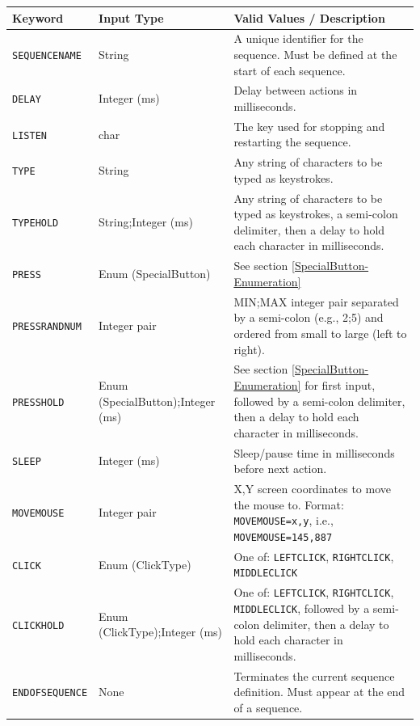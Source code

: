 \begin{table}[h]
	\centering
	\label{tab:sequencer_keywords}
	\begin{tabularx}{\textwidth}{|l|l|X|}
		\hline
		\textbf{Keyword} & \textbf{Input Type} & \textbf{Valid Values / Description} \\
		\hline
		\texttt{SEQUENCENAME} & String & A unique identifier for the sequence. Must be defined at the start of each sequence. \\
		\hline
		\texttt{DELAY} & Integer (ms) & Delay between actions in milliseconds.  \\
		\hline
		\texttt{LISTEN} & char & The key used for stopping and restarting the sequence.  \\
		\hline
		\texttt{TYPE} & String & Any string of characters to be typed as keystrokes. \\
		\hline
		\texttt{TYPEHOLD} & String;Integer (ms) & Any string of characters to be typed as keystrokes, a semi-colon delimiter, then a delay to hold each character in milliseconds. \\
		\hline
		\texttt{PRESS} & Enum (SpecialButton) & See section \ref{SpecialButton-Enumeration}\\
		\hline
		\texttt{PRESSRANDNUM} & Integer pair & MIN;MAX integer pair separated by a semi-colon (e.g., 2;5) and ordered from small to large (left to right). \\
		\hline
		\texttt{PRESSHOLD} & Enum (SpecialButton);Integer (ms) & See section \ref{SpecialButton-Enumeration} for first input, followed by a semi-colon delimiter, then a delay to hold each character in milliseconds.\\
		\hline
		\texttt{SLEEP} & Integer (ms) & Sleep/pause time in milliseconds before next action. \\
		\hline
		\texttt{MOVEMOUSE} & Integer pair & X,Y screen coordinates to move the mouse to. Format: \texttt{MOVEMOUSE=x,y}, i.e., \texttt{MOVEMOUSE=145,887} \\
		\hline
		\texttt{CLICK} & Enum (ClickType) & One of: \texttt{LEFTCLICK}, \texttt{RIGHTCLICK}, \texttt{MIDDLECLICK} \\
		\hline
		\texttt{CLICKHOLD} & Enum (ClickType);Integer (ms) & One of: \texttt{LEFTCLICK}, \texttt{RIGHTCLICK}, \texttt{MIDDLECLICK}, followed by a semi-colon delimiter, then a delay to hold each character in milliseconds. \\
		\hline
		\texttt{ENDOFSEQUENCE} & None & Terminates the current sequence definition. Must appear at the end of a sequence. \\
		\hline
	\end{tabularx}
\end{table}

